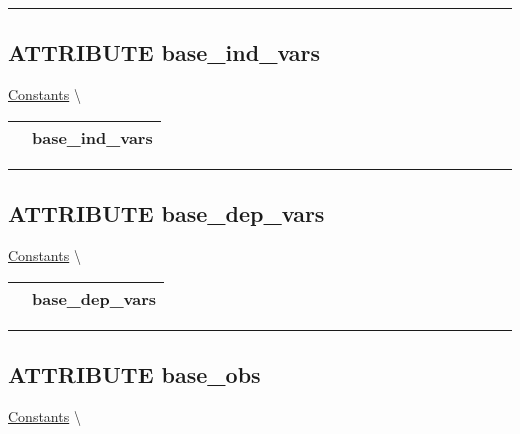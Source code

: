 \par


\rule{\linewidth}{0.5pt}
\subsection*{\textsf{\colorbox{headtoc}{\color{white} ATTRIBUTE}
base\_ind\_vars}}

\hypertarget{ecldoc:logisticregression.constants.base_ind_vars}{}
\hspace{0pt} \hyperlink{ecldoc:LogisticRegression.Constants}{Constants} \textbackslash 

{\renewcommand{\arraystretch}{1.5}
\begin{tabularx}{\textwidth}{|>{\raggedright\arraybackslash}l|X|}
\hline
\hspace{0pt}\mytexttt{\color{red} } & \textbf{base\_ind\_vars} \\
\hline
\end{tabularx}
}

\par


\rule{\linewidth}{0.5pt}
\subsection*{\textsf{\colorbox{headtoc}{\color{white} ATTRIBUTE}
base\_dep\_vars}}

\hypertarget{ecldoc:logisticregression.constants.base_dep_vars}{}
\hspace{0pt} \hyperlink{ecldoc:LogisticRegression.Constants}{Constants} \textbackslash 

{\renewcommand{\arraystretch}{1.5}
\begin{tabularx}{\textwidth}{|>{\raggedright\arraybackslash}l|X|}
\hline
\hspace{0pt}\mytexttt{\color{red} } & \textbf{base\_dep\_vars} \\
\hline
\end{tabularx}
}

\par


\rule{\linewidth}{0.5pt}
\subsection*{\textsf{\colorbox{headtoc}{\color{white} ATTRIBUTE}
base\_obs}}

\hypertarget{ecldoc:logisticregression.constants.base_obs}{}
\hspace{0pt} \hyperlink{ecldoc:LogisticRegression.Constants}{Constants} \textbackslash 

